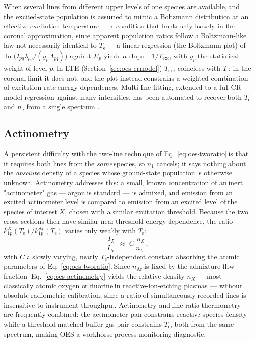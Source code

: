 When several lines from different upper levels of one species are available, and the excited-state population is assumed to mimic a Boltzmann distribution at an effective excitation temperature — a condition that holds only loosely in the coronal approximation, since apparent population ratios follow a Boltzmann-like law not necessarily identical to $T_{\mathrm{e}}$ — a linear regression (the Boltzmann plot) of $\ln\!\big(I_{pq}\lambda_{pq}/(g_{p}A_{pq})\big)$ against $E_{p}$ yields a slope $-1/T_{\mathrm{exc}}$, with $g_{p}$ the statistical weight of level $p$. In LTE (Section~\ref{sec:oes-crmodel}) $T_{\mathrm{exc}}$ coincides with $T_{\mathrm{e}}$; in the coronal limit it does not, and the plot instead constrains a weighted combination of excitation-rate energy dependences. Multi-line fitting, extended to a full CR-model regression against many intensities, has been automated to recover both $T_{\mathrm{e}}$ and $n_{\mathrm{e}}$ from a single spectrum \cite{ref0237,ref0245}.

\subsection{Actinometry}

A persistent difficulty with the two-line technique of Eq.~\eqref{eq:oes-tworatio} is that it requires both lines from the \emph{same} species, so $n_{1}$ cancels; it says nothing about the \emph{absolute} density of a species whose ground-state population is otherwise unknown. Actinometry addresses this: a small, known concentration of an inert "actinometer" gas — argon is standard — is admixed, and emission from an excited actinometer level is compared to emission from an excited level of the species of interest $X$, chosen with a similar excitation threshold. Because the two cross sections then have similar near-threshold energy dependence, the ratio $k_{1p}^{X}(T_{\mathrm{e}})/k_{1p}^{\mathrm{Ar}}(T_{\mathrm{e}})$ varies only weakly with $T_{\mathrm{e}}$:
\begin{equation}
\frac{I_{X}}{I_{\mathrm{Ar}}} \;\approx\; C \, \frac{n_{X}}{n_{\mathrm{Ar}}},
\label{eq:oes-actinometry}
\end{equation}
with $C$ a slowly varying, nearly $T_{\mathrm{e}}$-independent constant absorbing the atomic parameters of Eq.~\eqref{eq:oes-tworatio}. Since $n_{\mathrm{Ar}}$ is fixed by the admixture flow fraction, Eq.~\eqref{eq:oes-actinometry} yields the relative density $n_{X}$ — most classically atomic oxygen or fluorine in reactive-ion-etching plasmas — without absolute radiometric calibration, since a ratio of simultaneously recorded lines is insensitive to instrument throughput. Actinometry and line-ratio thermometry are frequently combined: the actinometer pair constrains reactive-species density while a threshold-matched buffer-gas pair constrains $T_{\mathrm{e}}$, both from the same spectrum, making OES a workhorse process-monitoring diagnostic.

